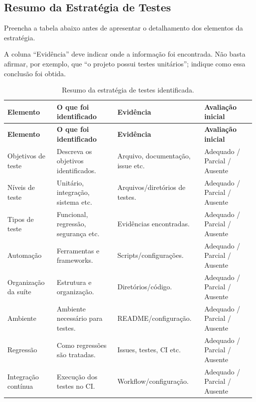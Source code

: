 \subsection{Resumo da Estratégia de Testes}

Preencha a tabela abaixo antes de apresentar o detalhamento
dos elementos da estratégia.

A coluna ``Evidência'' deve indicar onde a informação foi
encontrada. Não basta afirmar, por exemplo, que ``o projeto
possui testes unitários''; indique como essa conclusão foi obtida.

\begin{longtable}{p{3.0cm} p{4.2cm} p{4.2cm} p{2.5cm}}
\caption{Resumo da estratégia de testes identificada.}
\label{tab:estrategia-resumo}\\
\toprule
\textbf{Elemento}
&
\textbf{O que foi identificado}
&
\textbf{Evidência}
&
\textbf{Avaliação inicial}
\\
\midrule
\endfirsthead

\toprule
\textbf{Elemento}
&
\textbf{O que foi identificado}
&
\textbf{Evidência}
&
\textbf{Avaliação inicial}
\\
\midrule
\endhead

Objetivos de teste
&
Descreva os objetivos identificados.
&
Arquivo, documentação, issue etc.
&
Adequado / Parcial / Ausente
\\

Níveis de teste
&
Unitário, integração, sistema etc.
&
Arquivos/diretórios de testes.
&
Adequado / Parcial / Ausente
\\

Tipos de teste
&
Funcional, regressão, segurança etc.
&
Evidências encontradas.
&
Adequado / Parcial / Ausente
\\

Automação
&
Ferramentas e frameworks.
&
Scripts/configurações.
&
Adequado / Parcial / Ausente
\\

Organização da suíte
&
Estrutura e organização.
&
Diretórios/código.
&
Adequado / Parcial / Ausente
\\

Ambiente
&
Ambiente necessário para testes.
&
README/configuração.
&
Adequado / Parcial / Ausente
\\

Regressão
&
Como regressões são tratadas.
&
Issues, testes, CI etc.
&
Adequado / Parcial / Ausente
\\

Integração contínua
&
Execução dos testes no CI.
&
Workflow/configuração.
&
Adequado / Parcial / Ausente
\\


\end{longtable}
